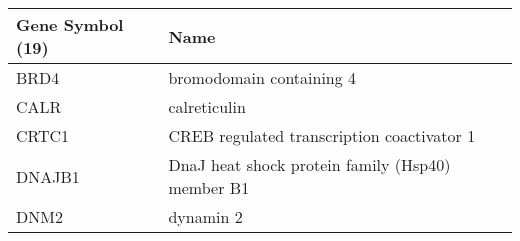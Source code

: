 \begin{tabular}{ll}
\toprule
Gene Symbol (19) &                                             Name \\
\midrule
            BRD4 &                         bromodomain containing 4 \\
            CALR &                                     calreticulin \\
           CRTC1 &       CREB regulated transcription coactivator 1 \\
          DNAJB1 & DnaJ heat shock protein family (Hsp40) member B1 \\
            DNM2 &                                        dynamin 2 \\
\bottomrule
\end{tabular}
